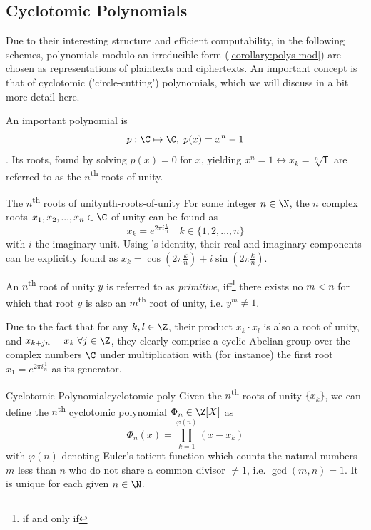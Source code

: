 \subsection{Cyclotomic Polynomials}
Due to their interesting structure and efficient computability, in the following schemes,
polynomials modulo an irreducible form (\autoref{corollary:polys-mod}) are
chosen as representations of plaintexts and ciphertexts.
An important concept is that of cyclotomic ('circle-cutting') polynomials, which we will discuss
in a bit more detail here.

An important polynomial is $$p: \C \mapsto \C, \; p(x) = x^n - 1$$.
Its roots, found by solving $p(x) = 0$ for $x$, yielding $x^n = 1 \leftrightarrow x_k = \sqrt[n]{1}$
are referred to as the $n$\textsuperscript{th} roots of unity.

\begin{lemma}{The $n$\textsuperscript{th} roots of unity}{nth-roots-of-unity}
  For some integer $n \in \N$, the $n$ complex roots $x_1, x_2, ..., x_n \in \C$ of unity
  can be found as $$x_k = e^{2\pi i \frac{k}{n}} \quad k \in \{1, 2, ..., n\}$$
  with $i$ the imaginary unit.
  Using 's identity, their real and imaginary components can be explicitly found as
  $x_k = \cos(2\pi \frac{k}{n}) + i \sin(2\pi \frac{k}{n})$.

  An $n$\textsuperscript{th} root of unity $y$ is referred to as \textit{primitive}, iff\footnote{if and only if}
  there exists no $m < n$ for which that root $y$ is also an $m$\textsuperscript{th} root of unity, i.e. $y^m \neq 1$.
\end{lemma}
Due to the fact that for any $k, l \in \Z$, their product $x_k \cdot x_l$ is also a root of unity, and
$x_{k+jn} = x_k \; \forall j \in \Z$, they clearly comprise a cyclic Abelian group over the complex numbers
$\C$ under multiplication with (for instance) the first root $x_1 = e^{2\pi i \frac{1}{n}}$ as its generator.

\begin{definition}{Cyclotomic Polynomial}{cyclotomic-poly}
  Given the $n$\textsuperscript{th} roots of unity $\{x_k\}$, we can define the $n$\textsuperscript{th}
  cyclotomic polynomial $\Phi_n \in \Z[X]$ as
  $$\Phi_n(x) = \prod_{k=1}^{\varphi(n)} (x - x_k)$$
  with $\varphi(n)$ denoting Euler's totient function which counts the
  natural numbers $m$ less than $n$ who do not share a common divisor $\neq 1$, i.e. $\gcd(m, n) = 1$.
  It is unique for each given $n \in \N$.
\end{definition}

